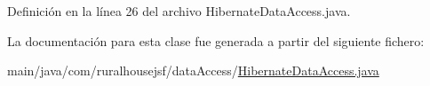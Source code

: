 Definición en la línea 26 del archivo Hibernate\+Data\+Access.\+java.



La documentación para esta clase fue generada a partir del siguiente fichero\+:\begin{DoxyCompactItemize}
\item 
main/java/com/ruralhousejsf/data\+Access/\mbox{\hyperlink{a00014}{Hibernate\+Data\+Access.\+java}}\end{DoxyCompactItemize}
